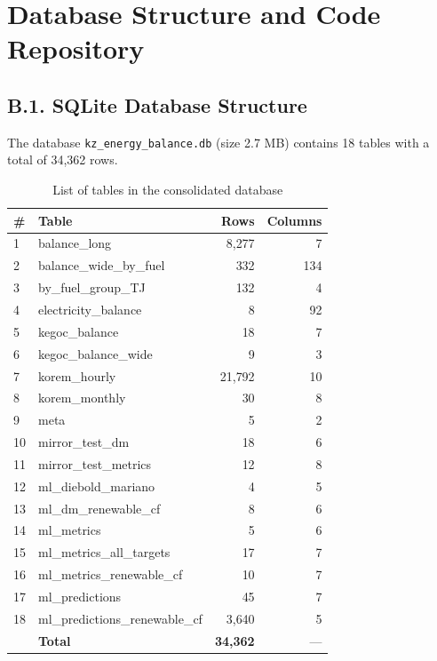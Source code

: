 
\chapter{Database Structure and Code Repository}
\label{app:data}

\section*{B.1. SQLite Database Structure}

The database \verb|kz_energy_balance.db| (size 2.7 MB) contains 18 tables
with a total of 34{,}362 rows.

\begin{table}[h!]
\centering
\caption{List of tables in the consolidated database}
\label{tab:db_tables}
\small
\begin{tabular}{@{}llrr@{}}
\toprule
\# & Table & Rows & Columns \\
\midrule
1 & balance\_long & 8{,}277 & 7 \\
2 & balance\_wide\_by\_fuel & 332 & 134 \\
3 & by\_fuel\_group\_TJ & 132 & 4 \\
4 & electricity\_balance & 8 & 92 \\
5 & kegoc\_balance & 18 & 7 \\
6 & kegoc\_balance\_wide & 9 & 3 \\
7 & korem\_hourly & 21{,}792 & 10 \\
8 & korem\_monthly & 30 & 8 \\
9 & meta & 5 & 2 \\
10 & mirror\_test\_dm & 18 & 6 \\
11 & mirror\_test\_metrics & 12 & 8 \\
12 & ml\_diebold\_mariano & 4 & 5 \\
13 & ml\_dm\_renewable\_cf & 8 & 6 \\
14 & ml\_metrics & 5 & 6 \\
15 & ml\_metrics\_all\_targets & 17 & 7 \\
16 & ml\_metrics\_renewable\_cf & 10 & 7 \\
17 & ml\_predictions & 45 & 7 \\
18 & ml\_predictions\_renewable\_cf & 3{,}640 & 5 \\
\midrule
& \textbf{Total} & \textbf{34{,}362} & --- \\
\bottomrule
\end{tabular}
\end{table}

